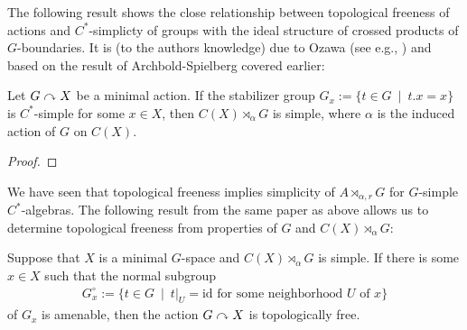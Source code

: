 The following result shows the close relationship between topological freeness of actions and $C^*$-simplicty of groups with the ideal structure of crossed products of $G$-boundaries. It is (to the authors knowledge) due to Ozawa (see e.g., \cite{ozawa2014lecture}) and based on the result of Archbold-Spielberg covered earlier:
\begin{proposition}
	Let $G \stackrel{}{\curvearrowright} X$ be a minimal action. If the stabilizer group $G_x := \{ t \in G \ \mid \ t.x =x\}$ is $C^*$-simple for some $x \in X$, then $C(X) \rtimes_\alpha G$ is simple, where $\alpha$ is the induced action of $G$ on $C(X)$.
\end{proposition}
\begin{proof}
	
\end{proof}
We have seen that topological freeness implies simplicity of $A \rtimes_{\alpha,r} G$ for $G$-simple $C^*$-algebras. The following result from the same paper as above allows us to determine topological freeness from properties of $G$ and $C(X)\rtimes_\alpha G$:
\begin{proposition}
	Suppose that $X$ is a minimal $G$-space and $C(X) \rtimes_\alpha G$ is simple. If there is some $x \in X$ such that the normal subgroup 
	\begin{align*}
		G_x^\circ := \{t \in G \ \mid \ t|_U = \mathrm{id} \text{ for some neighborhood } U \text{ of } x\}
	\end{align*}
	of $G_x$ is amenable, then the action $G \stackrel{ }{\curvearrowright} X$ is topologically free.
\end{proposition}


